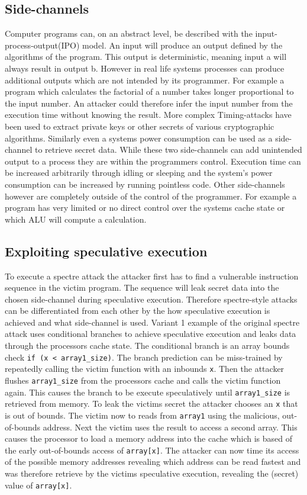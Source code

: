 \documentclass[conference,compsoc,final,a4paper]{IEEEtran}
\begin{document}
\subsection{Side-channels}
Computer programs can, on an abstract level, be described with the input-process-output(IPO) model. An input will produce an output defined by the algorithms
of the program. This output is deterministic, meaning input a will always result in output b. However in real life systems processes can produce additional outputs
which are not intended by its programmer. For example a program which calculates the factorial of a number takes longer proportional to the input number.
An attacker could therefore infer the input number from the execution time without knowing the result. More complex Timing-attacks have been used to
extract private keys or other secrets of various cryptographic algorithms. \cite{bernstein2005cache}\cite{kocher1996timing}
Similarly even a systems power consumption can be used as a side-channel to retrieve secret data. \cite{kocher1999differential}
While these two side-channels can add unintended output to a process they are within the programmers control. Execution time can be increased arbitrarily through
idling or sleeping and the system's power consumption can be increased by running pointless code. Other side-channels however are completely outside of the
control of the programmer. For example a program has very limited or no direct control over the systems cache state or which ALU will compute a calculation.
\subsection{Exploiting speculative execution}
To execute a spectre attack the attacker first has to find a vulnerable instruction sequence in the victim program. The sequence will leak secret data into the chosen
side-channel during speculative execution. Therefore spectre-style attacks can be differentiated from each other by the how speculative execution is achieved
and what side-channel is used. \cite{kocher2018spectre} Variant 1 example of the original spectre attack uses conditional branches to achieve speculative
execution and leaks data through the processors cache state. The conditional branch is an array bounds check \lstinline|if (x < array1_size)|. The branch prediction
can be miss-trained by repeatedly calling the victim function with an inbounds \lstinline|x|. Then the attacker flushes \lstinline|array1_size| from the processors
cache and calls the victim function again. This causes the branch to be execute speculatively until \lstinline|array1_size| is retrieved from memory. To leak
the victims secret the attacker chooses an \lstinline|x| that is out of bounds. The victim now to reads from \lstinline|array1| using the malicious, out-of-bounds
address. Next the victim uses the result to access a second array. This causes the processor to load a memory address into the cache which is based of the early
out-of-bounds access of \lstinline|array[x]|. The attacker can now time its access of the possible memory addresses revealing which address can be read fastest and
was therefore retrieve by the victims speculative execution, revealing the (secret) value of \lstinline|array[x]|.
\end{document}
